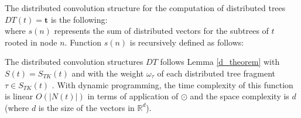 \documentclass[twoside,11pt]{article}
\def\vec#1{\mathbf{#1}}
\def\svec#1{\vec{#1}}
\def\mo{\odot}
\newcounter{properties}
\begin{document}





The distributed convolution structure for the computation of distributed trees $DT(t)=\svec{t}$ is the following:
\begin{equation}

\label{distributed_vectors}
\end{equation}
where $s(n)$ represents the sum of distributed vectors for the subtrees of $t$ rooted in node $n$.
Function $s(n)$ is recursively defined as follows:
\begin{displaymath}

\end{displaymath}

The distributed convolution structures $DT$ follows Lemma \ref{d_theorem} with $S(t)=S_{TK}(t)$ and with the weight $\omega_{\tau}$ of each distributed tree fragment $\tau\in S_{TK}(t)$  .
With dynamic programming, the time complexity of this function is linear $O(|N(t)|)$ in terms of application of $\mo$ and the space complexity is $d$ (where $d$ is the size of the vectors in ${\mathbb R}^d$).


\end{document}
